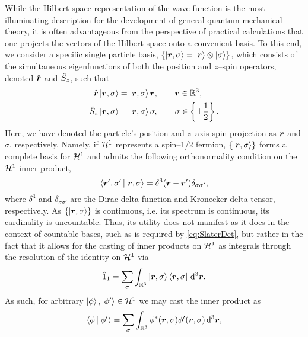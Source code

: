 While the Hilbert space representation of the wave function is the most illuminating description for the development of
general quantum mechanical theory, it is often advantageous from the perspective of practical calculations that one
projects the vectors of the Hilbert space onto a convenient basis. 
To this end, we consider a specific single particle basis, $\left \lbrace \left\vert \boldsymbol{r},\sigma \right\rangle = \left\vert \boldsymbol{r} \right\rangle\otimes\left\vert \sigma \right\rangle \right\rbrace$, 
which consists of the simultaneous eigenfunctions
of both the position and $z$--spin operators, denoted $\hat{\boldsymbol{r}}$ and $\hat{S}_z$,
such that
\begin{subequations}
\begin{align}
  \hat{\boldsymbol{r}}\left\vert \boldsymbol{r},\sigma \right\rangle &= \left\vert \boldsymbol{r},\sigma \right\rangle\boldsymbol{r}, \qquad \boldsymbol{r}\in\mathbb{R}^3, \\
  \hat{S}_z\left\vert \boldsymbol{r},\sigma \right\rangle    &= \left\vert \boldsymbol{r},\sigma \right\rangle\sigma, \qquad \sigma \in \left \lbrace \pm\frac{1}{2} \right\rbrace.
\end{align}
\end{subequations}
Here, we have denoted the particle's position and $z$--axis spin projection as $\boldsymbol{r}$ and $\sigma$, respectively.
Namely, if $\mathcal{H}^1$ represents a spin--1/2 fermion, $\left \lbrace \left\vert \boldsymbol{r},\sigma \right\rangle \right\rbrace$ forms a complete basis for $\mathcal{H}^1$ 
and admits the following orthonormality  condition on the $\mathcal{H}^1$ inner product,
\begin{equation}
  \label{eq:SpinorInner}
  \left\langle \boldsymbol{r}',\sigma' \left\vert\right. \boldsymbol{r},\sigma \right\rangle = \delta^3(\boldsymbol{r} - \boldsymbol{r}')\delta_{\sigma\sigma'},
\end{equation}
where $\delta^3$ and $\delta_{\sigma\sigma'}$ are the Dirac delta function and Kronecker delta tensor, respectively.
As $\left \lbrace \left\vert \boldsymbol{r},\sigma \right\rangle \right\rbrace$ is continuous, i.e. its spectrum is continuous, its cardinality is uncountable. Thus,
its utility does not manifest as it does in the context of countable bases, such as is required by \cref{eq:SlaterDet},
but rather in the fact that it allows for the casting of inner products on $\mathcal{H}^1$ as integrals through the resolution
of the identity on $\mathcal{H}^1$ via
\begin{equation}
  \label{eq:H1Identity}
  \hat{1}_1 = \sum_\sigma \int_{\mathbb R ^3} \left\vert \boldsymbol{r},\sigma \right\rangle\left\langle \boldsymbol{r},\sigma \right\vert \,\mathrm{d}^3\boldsymbol{r}.
\end{equation}
As such, for arbitrary $\left\vert \phi \right\rangle,\left\vert \phi' \right\rangle\in\mathcal{H}^1$ we may cast the inner product as
\begin{equation}
\left\langle \phi \left\vert\right. \phi' \right\rangle = \sum_\sigma \int_{\mathbb R ^3} \phi^*(\boldsymbol{r},\sigma) \phi'(\boldsymbol{r},\sigma) \,\mathrm{d}^3\boldsymbol{r},
\end{equation}

